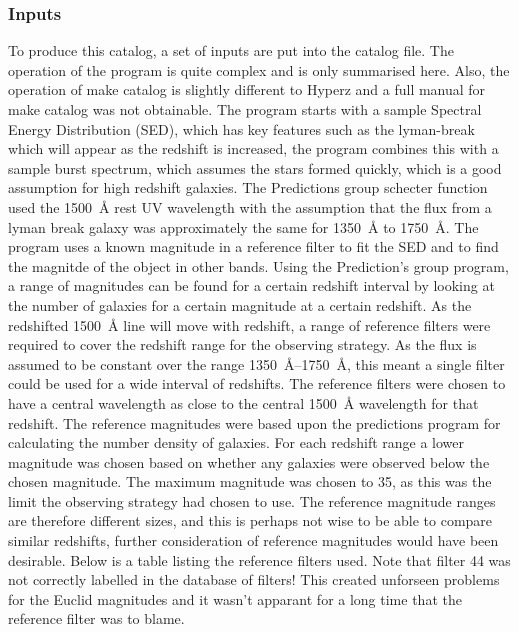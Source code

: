         \subsubsection{Inputs} %
        \label{subsub:Hyperz_inputs}
			To produce this catalog, a set of inputs are put into the catalog file. The operation of the program is quite complex and is only summarised here. Also, the operation of make catalog is slightly different to Hyperz and a full manual for make catalog was not obtainable. The program starts with a sample Spectral Energy Distribution (SED), which has key features such as the lyman-break which will appear as the redshift is increased, the program combines this with a sample burst spectrum, which assumes the stars formed quickly, which is a good assumption for high redshift galaxies\cite{hyperz}. The Predictions group schecter function used the \SI{1500}{\angstrom} rest UV wavelength with the assumption that the flux from a lyman break galaxy was approximately the same for \SI{1350}{\angstrom} to \SI{1750}{\angstrom}. The program uses a known magnitude in a reference filter to fit the SED and to find the magnitde of the object in other bands. Using the Prediction's group program, a range of magnitudes can be found for a certain redshift interval by looking at the number of galaxies for a certain magnitude at a certain redshift. As the redshifted \SI{1500}{\angstrom} line will move with redshift, a range of reference filters were required to cover the redshift range for the observing strategy. As the flux is assumed to be constant over the range \SI{1350}{\angstrom}--\SI{1750}{\angstrom}, this meant a single filter could be used for a wide interval of redshifts. The reference filters were chosen to have a central wavelength as close to the central \SI{1500}{\angstrom} wavelength for that redshift. The reference magnitudes were based upon the predictions program for calculating the number density of galaxies. For each redshift range a lower magnitude was chosen based on whether any galaxies were observed below the chosen magnitude. The maximum magnitude was chosen to 35, as this was the limit the observing strategy had chosen to use. The reference magnitude ranges are therefore different sizes, and this is perhaps not wise to be able to compare similar redshifts, further consideration of reference magnitudes would have been desirable. Below is a table listing the reference filters used. Note that filter 44 was not correctly labelled in the database of filters! This created unforseen problems for the Euclid magnitudes and it wasn't apparant for a long time that the reference filter was to blame.
